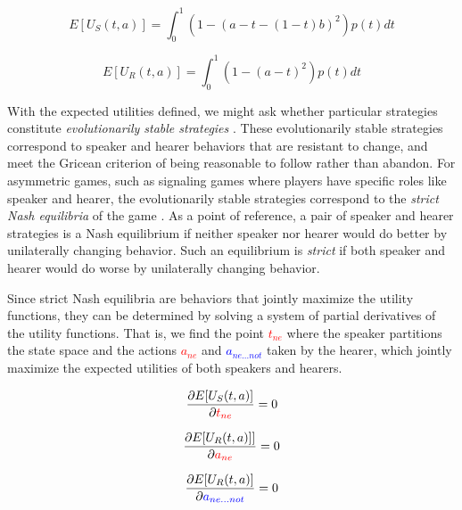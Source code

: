 \documentclass[linguex]{sp}
\theoremstyle{definition} \newtheorem{definition}{Definition}
\begin{document}
\begin{equation}
     E[U_S(t, a)] = \int_0^1 \left( 1 -(a - t - (1-t)b)^2 \right)p(t)dt
\end{equation}

\begin{equation}
      E[U_R(t, a)] = \int_0^1 \left( 1 -(a - t)^2 \right) p(t) dt
\end{equation}

With the expected utilities defined, we might ask whether particular strategies constitute \emph{evolutionarily stable strategies} \citep{maynard-smith1982}. These evolutionarily stable strategies correspond to speaker and hearer behaviors that are resistant to change, and meet the Gricean \citeyearpar[29]{grice1975} criterion of being reasonable to follow rather than abandon. For asymmetric games, such as signaling games where players have specific roles like speaker and hearer, the evolutionarily stable strategies correspond to the \emph{strict Nash equilibria} of the game \citep{selten:1980}.  As a point of reference, a pair of speaker and hearer strategies is a Nash equilibrium if neither speaker nor hearer would do better by unilaterally changing behavior. Such an equilibrium is \emph{strict} if both speaker and hearer would do worse by unilaterally changing behavior.  

Since strict Nash equilibria are behaviors that jointly maximize the utility functions, they can be determined by solving a system of partial derivatives of the utility functions. That is, we find the point \emph{\textcolor{red}{$t_{ne}$}} where the speaker partitions the state space and the actions \emph{\textcolor{red}{$a_{ne}$}} and \emph{\textcolor{blue}{$a_{ne...not}$}} taken by the hearer, which jointly maximize the expected utilities of both speakers and hearers.

\begin{equation}
	\frac{\partial E[U_S(t, a)]}{\partial \emph{\textcolor{red}{$t_{ne}$}}} =  0 \\
\end{equation}

\begin{equation}
	\frac{\partial E[U_R(t, a)]]}{\partial \emph{\textcolor{red}{$a_{ne}$}}} = 0 \\
\end{equation}


\begin{equation}
	\frac{\partial E[U_R(t, a)]}{\partial \emph{\textcolor{blue}{$a_{ne...not}$}}} = 0
\end{equation}
\end{document}

